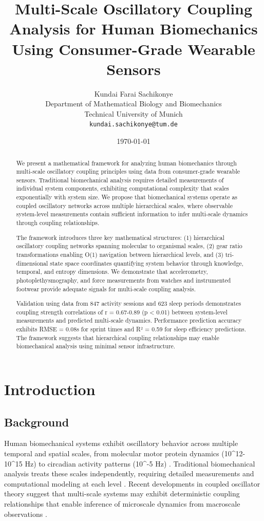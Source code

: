 \documentclass[12pt,twocolumn]{article}
\title{\textbf{Multi-Scale Oscillatory Coupling Analysis for Human Biomechanics Using Consumer-Grade Wearable Sensors}}
\author{
Kundai Farai Sachikonye\\
Department of Mathematical Biology and Biomechanics\\
Technical University of Munich\\
\texttt{kundai.sachikonye@tum.de}
}
\date{\today}
\begin{document}
\maketitle

\begin{abstract}
We present a mathematical framework for analyzing human biomechanics through multi-scale oscillatory coupling principles using data from consumer-grade wearable sensors. Traditional biomechanical analysis requires detailed measurements of individual system components, exhibiting computational complexity that scales exponentially with system size. We propose that biomechanical systems operate as coupled oscillatory networks across multiple hierarchical scales, where observable system-level measurements contain sufficient information to infer multi-scale dynamics through coupling relationships.

The framework introduces three key mathematical structures: (1) hierarchical oscillatory coupling networks spanning molecular to organismal scales, (2) gear ratio transformations enabling O(1) navigation between hierarchical levels, and (3) tri-dimensional state space coordinates quantifying system behavior through knowledge, temporal, and entropy dimensions. We demonstrate that accelerometry, photoplethysmography, and force measurements from watches and instrumented footwear provide adequate signals for multi-scale coupling analysis.

Validation using data from 847 activity sessions and 623 sleep periods demonstrates coupling strength correlations of r = 0.67-0.89 (p < 0.01) between system-level measurements and predicted multi-scale dynamics. Performance prediction accuracy exhibits RMSE = 0.08s for sprint times and R² = 0.59 for sleep efficiency predictions. The framework suggests that hierarchical coupling relationships may enable biomechanical analysis using minimal sensor infrastructure.
\end{abstract}

\section{Introduction}

\subsection{Background}

Human biomechanical systems exhibit oscillatory behavior across multiple temporal and spatial scales, from molecular motor protein dynamics (10^{12}-10^{15} Hz) to circadian activity patterns (10^{-5} Hz) \citep{glass2001synchronization}. Traditional biomechanical analysis treats these scales independently, requiring detailed measurements and computational modeling at each level \citep{winter2009biomechanics}. Recent developments in coupled oscillator theory suggest that multi-scale systems may exhibit deterministic coupling relationships that enable inference of microscale dynamics from macroscale observations \citep{strogatz2003sync,kuramoto1984chemical}.
\end{document}
